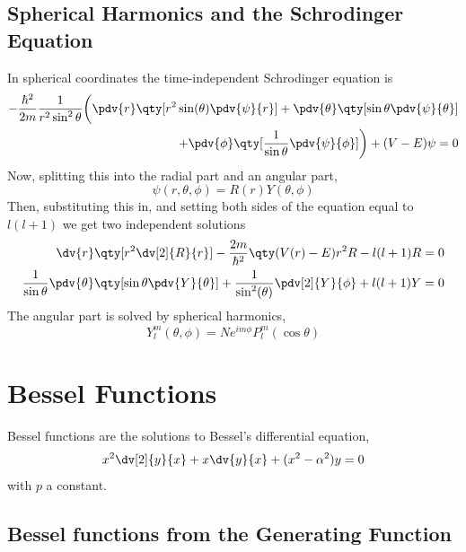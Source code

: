 \subsection{Spherical Harmonics and the Schrodinger Equation}
\label{sec:spherharmschrod}

In spherical coordinates the time-independent Schrodinger equation is
\begin{equation}
  \label{eq:tisespherical}
  \begin{split}
  - \frac{\hbar^2}{2m} \frac{1}{r^2 \sin^2 \theta} \bigg( \pdv{r} \qty[ r^2 \sin(\theta) \pdv{\psi}{r}] 
+ \pdv{\theta} \qty[ \sin \theta  \pdv{\psi}{\theta}] \\ + \pdv{\phi} \qty[ \frac{1}{\sin \theta} \pdv{\psi}{\phi}] \bigg) 
+ (V-E)\psi = 0
\end{split}
\end{equation}
Now, splitting this into the radial part and an angular part,
\begin{equation}
  \label{eq:sepschrod}
  \psi(r, \theta, \phi) = R(r) Y(\theta, \phi)
\end{equation}
Then, substituting this in, and setting both sides of the equation
equal to $l(l+1)$ we get two independent solutions
\begin{align}
  \dv{r} \qty[r^2 \dv[2]{R}{r}] - \frac{2m}{\hbar^2} \qty(V(r)-E) r^2
  R - l(l+1) R &= 0 \\\frac{1}{\sin \theta} \pdv{\theta} \qty[ \sin
  \theta \pdv{Y}{\theta}] + \frac{1}{\sin^2(\theta)}
  \pdv[2]{Y}{\phi} +l(l+1)Y &= 0
\end{align}
The angular part is solved by spherical harmonics,
\begin{equation}
  \label{eq:sphericalharmonics}
  Y_l^m(\theta, \phi) = N e^{im\phi} P_l^m (\cos \theta)
\end{equation}

\section{Bessel Functions}
\label{sec:bessel}

Bessel functions are the solutions to Bessel's differential equation,
\begin{equation}
  \label{eq:besselde}
  x^2 \dv[2]{y}{x} + x \dv{y}{x} + (x^2 - \alpha^2)y = 0
\end{equation}
with $p$ a constant. 

\subsection{Bessel functions from the Generating Function}
\label{sec:besselgen}

